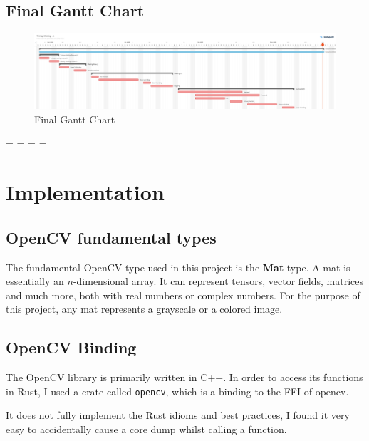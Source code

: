 \documentclass[a4paper]{article}
\begin{document}
\newpage

\subsection{Final Gantt Chart}

\begin{figure}[h]
    \includegraphics[width=\textwidth]{gantt/gantt2.jpg}
    \caption{Final Gantt Chart}
\end{figure}


\endgroup
\newpage
\addtolength\headwidth{-1\mtL}


\paperwidth=\pdfpageheight
\paperheight=\pdfpagewidth
\pdfpageheight=\paperheight
\pdfpagewidth=\paperwidth

\section{Implementation}

\subsection{OpenCV fundamental types}

The fundamental OpenCV type used in this project is the
\textbf{Mat}\cite{mat} type. A mat is essentially an
\(n\)-dimensional array. It can represent tensors, vector fields,
matrices and much more, both with real numbers or complex numbers.
For the purpose of this project, any mat represents a grayscale
or a colored image.

\subsection{OpenCV Binding}

The OpenCV library is primarily written in \gls{C++}.
In order to access its functions in \gls{Rust}, I used a crate
called \texttt{opencv}\cite{rustopencv}, which is a binding
to the \gls{FFI} of opencv.

It does not fully implement the \gls{Rust} idioms and best practices,
I found it very easy to accidentally cause a core dump
whilst calling a function.
\end{document}

